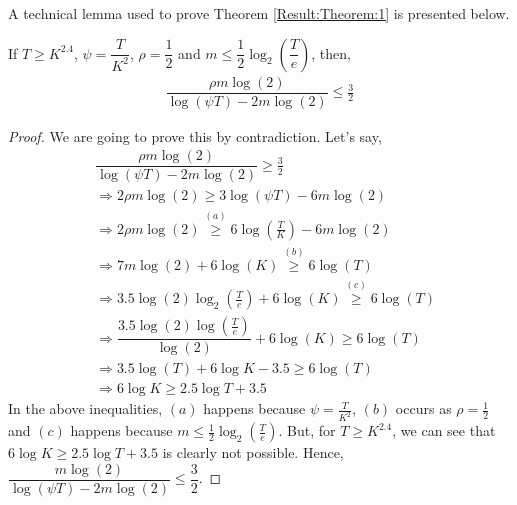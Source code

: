 A technical lemma used to prove Theorem \ref{Result:Theorem:1} is presented below.

\begin{lemma}
\label{proofTheorem:Lemma:1}
If $T\geq K^{2.4}$, $\psi=\dfrac{T}{ K^2}$, $\rho=\dfrac{1}{2}$ and $m\leq \dfrac{1}{2} \log_2(\dfrac{T}{e}) $, then,
\begin{align*}
\dfrac{\rho m \log(2)}{\log(\psi T) - 2m\log( 2)} \leq \frac{3}{2}
\end{align*}
\end{lemma}
\begin{proof}
We are going to prove this by contradiction. Let's say,
\begin{align*}
 & \dfrac{\rho m \log(2)}{\log(\psi T) - 2m\log( 2)} \geq \frac{3}{2} \\
 &\Rightarrow 2\rho m \log(2) \geq 3\log(\psi T) - 6m\log( 2) \\
 &\Rightarrow 2\rho m \log(2) \overset{(a)}{\geq} 6\log(\frac{T}{K}) - 6m\log( 2) \\
 &\Rightarrow 7 m \log(2) + 6\log(K) \overset{(b)}{\geq} 6\log(T) \\
 &\Rightarrow 3.5 \log(2) \log_2(\frac{T}{e}) + 6\log(K) \overset{(c)}{\geq} 6\log(T) \\
 &\Rightarrow \dfrac{3.5 \log (2) \log (\frac{T}{e})}{\log(2)} + 6\log(K) \geq 6\log(T)\\
 &\Rightarrow 3.5 \log(T) + 6\log K - 3.5 \geq 6\log (T)\\
 &\Rightarrow 6\log K \geq 2.5 \log T + 3.5 
\end{align*}
In the above inequalities, $(a)$ happens because $\psi=\frac{T}{K^2}$, $(b)$ occurs as $\rho=\frac{1}{2}$ and $(c)$ happens because $m\leq \frac{1}{2} \log_2(\frac{T}{e})$. But, for $T\geq K^{2.4}$, we can see that $6\log K \geq 2.5 \log T + 3.5$ is clearly not possible. Hence, $\dfrac{m \log(2)}{\log(\psi T) - 2m\log( 2)} \leq \dfrac{3}{2}$.
\end{proof}

